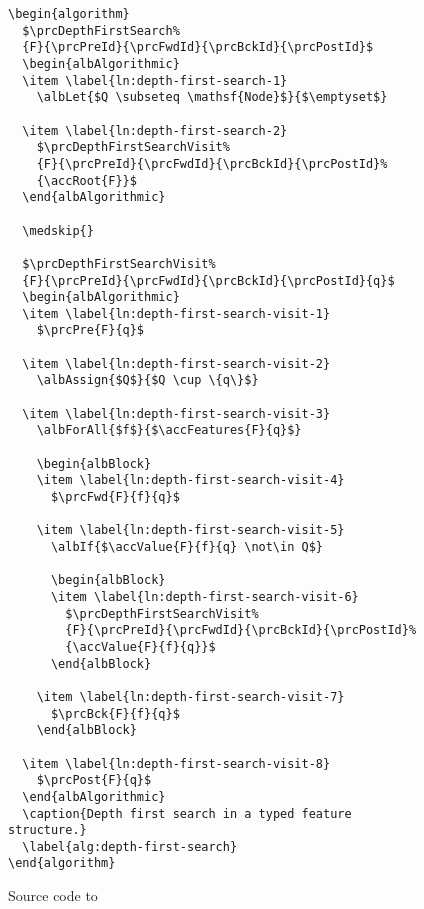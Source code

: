 \documentclass[11pt,a4paper,oneside,titlepage]{alb-latex}
\begin{document}
\begin{figure}
  \small{}
\begin{verbatim}
\begin{algorithm}
  $\prcDepthFirstSearch%
  {F}{\prcPreId}{\prcFwdId}{\prcBckId}{\prcPostId}$
  \begin{albAlgorithmic}
  \item \label{ln:depth-first-search-1}
    \albLet{$Q \subseteq \mathsf{Node}$}{$\emptyset$}

  \item \label{ln:depth-first-search-2}
    $\prcDepthFirstSearchVisit%
    {F}{\prcPreId}{\prcFwdId}{\prcBckId}{\prcPostId}%
    {\accRoot{F}}$
  \end{albAlgorithmic}

  \medskip{}

  $\prcDepthFirstSearchVisit%
  {F}{\prcPreId}{\prcFwdId}{\prcBckId}{\prcPostId}{q}$
  \begin{albAlgorithmic}
  \item \label{ln:depth-first-search-visit-1}
    $\prcPre{F}{q}$

  \item \label{ln:depth-first-search-visit-2}
    \albAssign{$Q$}{$Q \cup \{q\}$}

  \item \label{ln:depth-first-search-visit-3}
    \albForAll{$f$}{$\accFeatures{F}{q}$}

    \begin{albBlock}
    \item \label{ln:depth-first-search-visit-4}
      $\prcFwd{F}{f}{q}$

    \item \label{ln:depth-first-search-visit-5}
      \albIf{$\accValue{F}{f}{q} \not\in Q$}

      \begin{albBlock}
      \item \label{ln:depth-first-search-visit-6}
        $\prcDepthFirstSearchVisit%
        {F}{\prcPreId}{\prcFwdId}{\prcBckId}{\prcPostId}%
        {\accValue{F}{f}{q}}$
      \end{albBlock}

    \item \label{ln:depth-first-search-visit-7}
      $\prcBck{F}{f}{q}$
    \end{albBlock}

  \item \label{ln:depth-first-search-visit-8}
    $\prcPost{F}{q}$
  \end{albAlgorithmic}
  \caption{Depth first search in a typed feature structure.}
  \label{alg:depth-first-search}
\end{algorithm}
\end{verbatim}
  \caption{Source code to \prcDepthFirstSearchId{}}
  \label{fig:alb-algorithms-documentation:source-code-prcd}
\end{figure}
\end{document}
